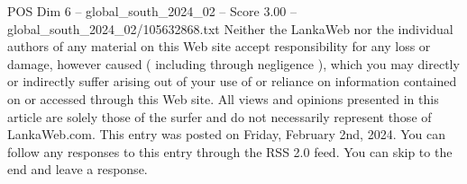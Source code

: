\begin{textsample}{POS Dim 6 – global\_south\_2024\_02 – Score 3.00 – global\_south\_2024\_02/105632868.txt}
Neither the LankaWeb nor the individual authors of any material on this Web site accept responsibility for any loss or damage, however caused ( including through negligence ), which you may directly or indirectly suffer arising out of your use of or reliance on information contained on or accessed through this Web site.
All views and opinions presented in this article are solely those of the surfer and do not necessarily represent those of LankaWeb.com.
This entry was posted on Friday, February 2nd, 2024.
You can follow any responses to this entry through the RSS 2.0 feed.
You can skip to the end and leave a response.

\end{textsample}
